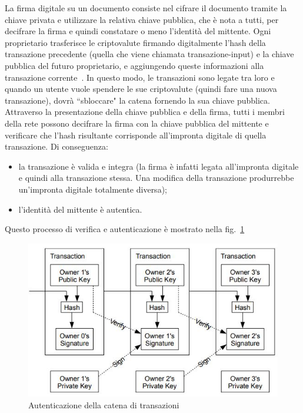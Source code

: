 La firma digitale su un documento consiste nel cifrare il documento tramite la chiave privata e utilizzare la relativa chiave pubblica, che \`e nota a tutti, per decifrare la firma e quindi constatare o meno l’identità del mittente.
Ogni proprietario trasferisce le criptovalute firmando digitalmente l’hash della transazione precedente (quella che viene chiamata transazione-input) e la chiave pubblica del futuro proprietario, e aggiungendo queste informazioni alla transazione corrente~\cite{art:satoshi}. In questo modo, le transazioni sono legate tra loro e quando un utente vuole spendere le sue criptovalute (quindi fare una nuova transazione), dovrà ``sbloccare" la catena fornendo la sua chiave pubblica. 
Attraverso la presentazione della chiave pubblica e della firma, tutti i membri della rete possono decifrare la firma con la chiave pubblica del mittente e verificare che l’hash risultante corrisponde all’impronta digitale di quella transazione. Di conseguenza:
\begin{itemize}
\item la transazione \`e valida e integra (la firma \`e infatti legata all’impronta digitale e quindi alla transazione stessa. Una modifica della transazione produrrebbe un’impronta digitale totalmente diversa);
\item l'identità del mittente \`e autentica.
\end{itemize}
Questo processo di verifica e autenticazione \`e mostrato nella fig.~\ref{im:verifica}
\begin{figure}[!h]
\centering 
\includegraphics[scale=0.75]{immagini/cap2/1-autenticazione} 
\caption{Autenticazione della catena di transazioni}
\label{im:verifica} 
\end{figure}


